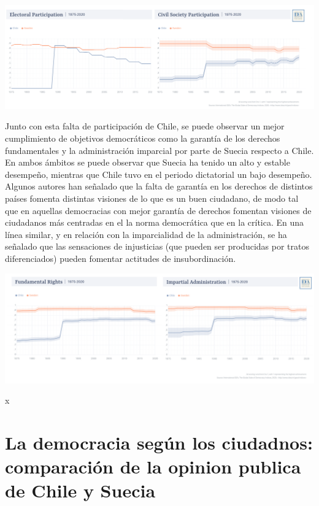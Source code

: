 \documentclass[12pt,twoside]{templates/facsothesis}
\begin{document}
\includegraphics{input/images/electoral-participation_1975-2020.png}

Junto con esta falta de participación de Chile, se puede observar un mejor cumplimiento de objetivos democráticos como la garantía de los derechos fundamentales y la administración imparcial por parte de Suecia respecto a Chile. En ambos ámbitos se puede observar que Suecia ha tenido un alto y estable desempeño, mientras que Chile tuvo en el periodo dictatorial un bajo desempeño. Algunos autores han señalado que la falta de garantía en los derechos de distintos países fomenta distintas visiones de lo que es un buen ciudadano, de modo tal que en aquellas democracias con mejor garantía de derechos fomentan visiones de ciudadanos más centradas en el la norma democrática que en la crítica. En una línea similar, y en relación con la imparcialidad de la administración, se ha señalado que las sensaciones de injusticias (que pueden ser producidas por tratos diferenciados) pueden fomentar actitudes de insubordinación.

\includegraphics{input/images/fundamental-rights_1975-2020.png}

x

\hypertarget{la-democracia-seguxfan-los-ciudadnos-comparaciuxf3n-de-la-opinion-publica-de-chile-y-suecia}{%
\chapter{La democracia según los ciudadnos: comparación de la opinion publica de Chile y Suecia}\label{la-democracia-seguxfan-los-ciudadnos-comparaciuxf3n-de-la-opinion-publica-de-chile-y-suecia}}
\end{document}
